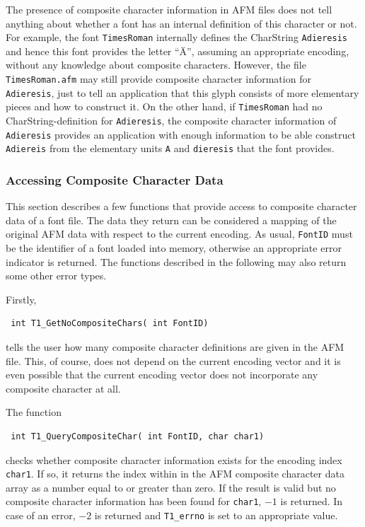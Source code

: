 The presence of composite character information in AFM files does not tell
anything about whether a font has an internal  definition of this character or
not. For example, the font \verb+TimesRoman+ internally defines the CharString
\verb+Adieresis+ and hence this font provides the letter ``\"A'', assuming an
appropriate encoding, without any knowledge about composite
characters. However, the file \verb+TimesRoman.afm+ may still 
provide composite character information for \verb+Adieresis+, just to tell an
application that this glyph consists of more elementary pieces and how to
construct it. On the other hand, if \verb+TimesRoman+ had no
CharString-definition for \verb+Adieresis+, the composite character
information of \verb+Adieresis+ provides an application with enough
information to be able construct \verb+Adiereis+ from the elementary units
\verb+A+ and \verb+dieresis+ that the font provides.


\subsubsection{Accessing Composite Character Data}
\label{subsubsec:Accessing Composite CHaracter Data}%

This section describes a few functions that provide access to composite
character data of a font file. The data they return can be considered a
mapping of the original AFM data with respect to the current encoding.  As
usual, \verb+FontID+ must be the identifier of a font loaded into memory,
otherwise an appropriate error indicator is returned. The functions described
in the following may also return some other error types.

Firstly,
\precorr
\begin{verbatim}
 int T1_GetNoCompositeChars( int FontID)
\end{verbatim}\postcorr
tells the user how many composite character definitions are given in the AFM
file. This, of course, does not depend on the current encoding vector and it
is even possible that the current encoding vector does not incorporate any
composite character at all. 

The function 
\precorr
\begin{verbatim}
 int T1_QueryCompositeChar( int FontID, char char1) 
\end{verbatim}\postcorr
checks whether composite character information exists for the encoding index
\verb+char1+. If so, it returns the index within in the AFM composite
character data array as a number equal to or greater than zero. If the result
is valid but no composite character information has been found for
\verb+char1+, $-1$ is returned. In case of an error, $-2$ is returned and
\verb+T1_errno+ is set to an appropriate value. 

